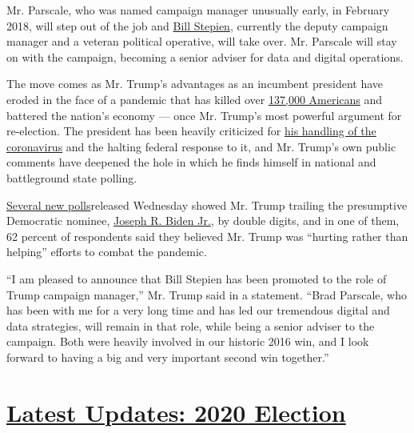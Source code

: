 Mr. Parscale, who was named campaign manager unusually early, in
February 2018, will step out of the job and
\href{https://www.nytimes3xbfgragh.onion/article/bill-stepien.html}{Bill
Stepien}, currently the deputy campaign manager and a veteran political
operative, will take over. Mr. Parscale will stay on with the campaign,
becoming a senior adviser for data and digital operations.

The move comes as Mr. Trump's advantages as an incumbent president have
eroded in the face of a pandemic that has killed over
\href{https://www.nytimes3xbfgragh.onion/interactive/2020/us/coronavirus-us-cases.html}{137,000
Americans} and battered the nation's economy --- once Mr. Trump's most
powerful argument for re-election. The president has been heavily
criticized for
\href{https://www.nytimes3xbfgragh.onion/2020/04/11/us/politics/coronavirus-trump-response.html}{his
handling of the coronavirus} and the halting federal response to it, and
Mr. Trump's own public comments have deepened the hole in which he finds
himself in national and battleground state polling.

\href{https://www.nytimes3xbfgragh.onion/2020/07/15/us/elections/biden-vs-trump.html}{Several
new polls}released Wednesday showed Mr. Trump trailing the presumptive
Democratic nominee,
\href{https://www.nytimes3xbfgragh.onion/interactive/2020/us/elections/joe-biden.html}{Joseph
R. Biden Jr.}, by double digits, and in one of them, 62 percent of
respondents said they believed Mr. Trump was ``hurting rather than
helping'' efforts to combat the pandemic.

``I am pleased to announce that Bill Stepien has been promoted to the
role of Trump campaign manager,'' Mr. Trump said in a statement. ``Brad
Parscale, who has been with me for a very long time and has led our
tremendous digital and data strategies, will remain in that role, while
being a senior adviser to the campaign. Both were heavily involved in
our historic 2016 win, and I look forward to having a big and very
important second win together.''

\hypertarget{latest-updates-2020-election}{%
\section{\texorpdfstring{\href{https://www.nytimes3xbfgragh.onion/2020/08/03/us/elections/biden-vs-trump.html?action=click\&pgtype=Article\&state=default\&region=MAIN_CONTENT_1\&context=storylines_live_updates}{Latest
Updates: 2020
Election}}{Latest Updates: 2020 Election}}\label{latest-updates-2020-election}}


